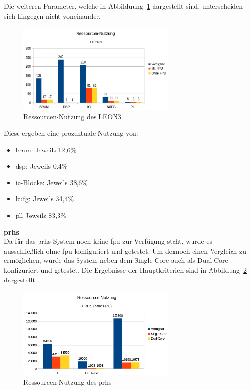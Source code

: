 Die weiteren Parameter, welche in Abbilduung~\ref{fig:ressourcenleon32} dargestellt sind, unterscheiden sich hingegen nicht voneinander.\\

\begin{figure}[H]
\centering
\includegraphics[width=0.7\textwidth]{Hauptteil/ressourcenleon32.png}
\caption{Ressourcen-Nutzung des LEON3}
\label{fig:ressourcenleon32}
\end{figure}

Diese ergeben eine prozentuale Nutzung von:\\
\begin{itemize}
  \item \ac{bram}: Jeweils 12,6\%
  \item \ac{dsp}: Jeweils 0,4\%
  \item \ac{io}-Blöcke: Jeweils 38,6\%
  \item \ac{bufg}: Jeweils 34,4\%
  \item \ac{pll} Jeweils 83,3\%
\end{itemize}


\textbf{\acl{prhs}}\\

Da für das \ac{prhs}-System noch keine \ac{fpu} zur Verfügung steht, wurde es ausschließlich ohne \ac{fpu} konfiguriert und getestet.
Um dennoch einen Vergleich zu ermöglichen, wurde das System neben dem Single-Core auch als Dual-Core konfiguriert und getestet.
Die Ergebnisse der Hauptkriterien sind in Abbildung~\ref{fig:ressourcenprhs1} dargestellt.\\

\begin{figure}[H]
\centering
\includegraphics[width=0.7\textwidth]{Hauptteil/ressourcenprhs1.png}
\caption{Ressourcen-Nutzung des \ac{prhs}}
\label{fig:ressourcenprhs1}
\end{figure}

